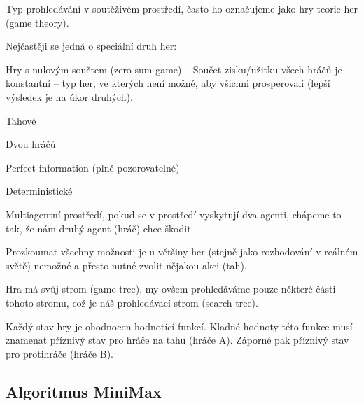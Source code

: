 \begin{compactitem}
    \item Typ prohledávání v soutěživém prostředí, často ho označujeme jako hry teorie her (game theory).

    \item Nejčastěji se jedná o speciální druh her: \begin{compactitem}
        \item Hry s nulovým součtem (zero-sum game) -- Součet zisku/užitku všech hráčů je konstantní -- typ her, ve kterých není možné, aby všichni prosperovali (lepší výsledek je na úkor druhých).
        \item Tahové
        \item Dvou hráčů
        \item Perfect information (plně pozorovatelné)
        \item Deterministické
    \end{compactitem}

    \item Multiagentní prostředí, pokud se v prostředí vyskytují dva agenti, chápeme to tak, že nám druhý agent (hráč) chce škodit.

    \item Prozkoumat všechny možnosti je u většiny her (stejně jako rozhodování v reálném světě) nemožné a přesto nutné zvolit nějakou akci (tah).

    \item Hra má svůj strom (game tree), my ovšem prohledáváme pouze některé části tohoto stromu, což je náš prohledávací strom (search tree).

    \item Každý stav hry je ohodnocen hodnotící funkcí. Kladné hodnoty této funkce musí znamenat příznivý stav pro hráče na tahu (hráče A). Záporné pak příznivý stav pro protihráče (hráče B).
\end{compactitem}

\subsection{Algoritmus MiniMax}

